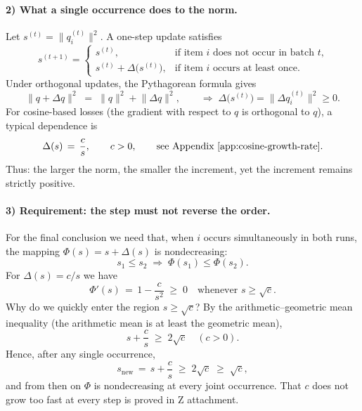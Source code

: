 \paragraph{2) What a single occurrence does to the norm.}
Let $s^{(t)} = \bigl\|q_i^{(t)}\bigr\|^2$. A one-step update satisfies
\begin{equation}
s^{(t+1)} = \begin{cases}
s^{(t)}, & \text{if item $i$ does not occur in batch $t$,} \\
s^{(t)} + \Delta\bigl(s^{(t)}\bigr), & \text{if item $i$ occurs at least once.}
\end{cases}
\end{equation}
Under orthogonal updates, the Pythagorean formula gives
\begin{equation}
\label{eq:pythagoras-increment}
\bigl\|q + \Delta q\bigr\|^2 \;=\; \|q\|^2 + \bigl\|\Delta q\bigr\|^2, \qquad \Rightarrow\; \Delta\bigl(s^{(t)}\bigr) = \bigl\|\Delta q_i^{(t)}\bigr\|^2 \ge 0.
\end{equation}
For cosine-based losses (the gradient with respect to $q$ is orthogonal to $q$), a typical dependence is
\begin{equation}
\Delta(s) \,=\, \frac{c}{s}, \qquad c>0, \qquad \text{see Appendix~\ref{app:cosine-growth-rate}}.
\end{equation}
Thus: the larger the norm, the smaller the increment, yet the increment remains strictly positive.

\paragraph{3) Requirement: the step must not reverse the order.}
For the final conclusion we need that, when $i$ occurs simultaneously in both runs, the mapping $\Phi(s) = s + \Delta(s)$ is nondecreasing:
\begin{equation}
s_1 \le s_2 \;\Rightarrow\; \Phi(s_1) \le \Phi(s_2).
\end{equation}
For $\Delta(s) = c/s$ we have
\begin{equation}
\Phi'(s) \,=\, 1 - \frac{c}{s^2} \;\ge\; 0 \quad \text{whenever } s \ge \sqrt{c}.
\end{equation}
Why do we quickly enter the region $s \ge \sqrt{c}$? By the arithmetic–geometric mean inequality (the arithmetic mean is at least the geometric mean),
\begin{equation}
s + \frac{c}{s} \;\ge\; 2\sqrt{c} \quad (c>0).
\end{equation}
Hence, after any single occurrence,
\begin{equation}
s_{\mathrm{new}} \,=\, s + \frac{c}{s} \;\ge\; 2\sqrt{c} \;\ge\; \sqrt{c},
\end{equation}
and from then on $\Phi$ is nondecreasing at every joint occurrence. That $c$ does not grow too fast at every step is proved in Z attachment.

